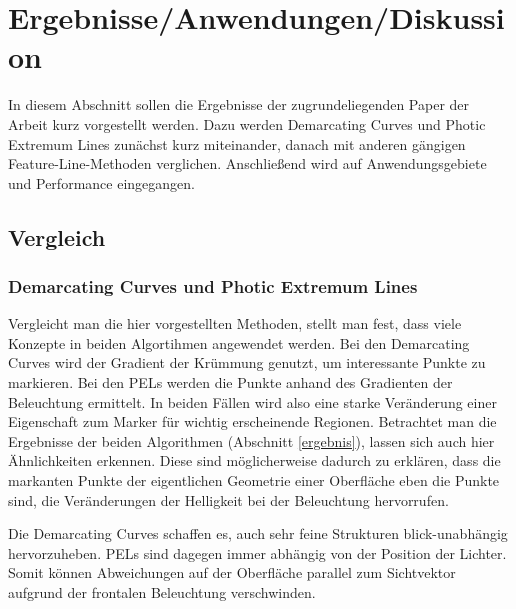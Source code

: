 \documentclass{paperStyle}
\begin{document}
\section{Ergebnisse/Anwendungen/Diskussion}
In diesem Abschnitt sollen die Ergebnisse der zugrundeliegenden Paper der Arbeit kurz vorgestellt werden. Dazu werden Demarcating Curves und Photic Extremum Lines zunächst kurz miteinander, danach mit anderen gängigen Feature-Line-Methoden verglichen. Anschließend wird auf Anwendungsgebiete und Performance eingegangen. 
\subsection{Vergleich}
\subsubsection{Demarcating Curves und Photic Extremum Lines}
Vergleicht man die hier vorgestellten Methoden, stellt man fest, dass viele Konzepte in beiden Algortihmen angewendet werden. Bei den Demarcating Curves wird der Gradient der Krümmung genutzt, um interessante Punkte zu markieren. Bei den PELs werden die Punkte anhand des Gradienten der Beleuchtung ermittelt. In beiden Fällen wird also eine starke Veränderung einer Eigenschaft zum Marker für wichtig erscheinende Regionen. Betrachtet man die Ergebnisse der beiden Algorithmen (Abschnitt \ref{ergebnis}), lassen sich auch hier Ähnlichkeiten erkennen. Diese sind möglicherweise dadurch zu erklären, dass die markanten Punkte der eigentlichen Geometrie einer Oberfläche eben die Punkte sind, die Veränderungen der Helligkeit bei der Beleuchtung hervorrufen. 

Die Demarcating Curves schaffen es, auch sehr feine Strukturen blick-unabhängig hervorzuheben. PELs sind dagegen immer abhängig von der Position der Lichter. Somit können Abweichungen auf der Oberfläche parallel zum Sichtvektor aufgrund der frontalen Beleuchtung verschwinden. 
\end{document}

